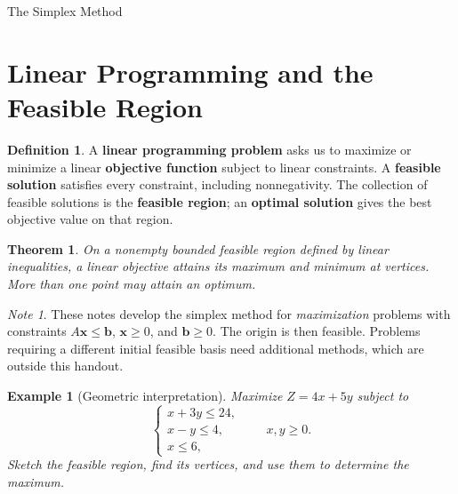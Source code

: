 \documentclass{article}
\theoremstyle{plain}
\newtheorem{theorem}{Theorem}[section]
\newtheorem{example}{Example}[section]
\theoremstyle{definition}
\newtheorem{definition}{Definition}[section]
\theoremstyle{remark}
\newtheorem*{note}{Note}
\renewcommand{\vec}[1]{\mathbf{#1}}
\begin{document}
\begin{center}\huge The Simplex Method\end{center}
\section{Linear Programming and the Feasible Region}
\begin{definition}
A \textbf{linear programming problem} asks us to maximize or minimize a linear \textbf{objective function} subject to linear constraints. A \textbf{feasible solution} satisfies every constraint, including nonnegativity. The collection of feasible solutions is the \textbf{feasible region}; an \textbf{optimal solution} gives the best objective value on that region.
\end{definition}
\begin{theorem}
On a nonempty bounded feasible region defined by linear inequalities, a linear objective attains its maximum and minimum at vertices. More than one point may attain an optimum.
\end{theorem}
\begin{note}
These notes develop the simplex method for \emph{maximization} problems with constraints $A\vec{x}\le\vec{b}$, $\vec{x}\ge0$, and $\vec{b}\ge0$. The origin is then feasible. Problems requiring a different initial feasible basis need additional methods, which are outside this handout.
\end{note}
\begin{example}[Geometric interpretation]\label{ex:geometry}
Maximize $Z=4x+5y$ subject to
\[
\begin{cases}x+3y\le24,\\x-y\le4,\\x\le6,\end{cases}\qquad x,y\ge0.
\]
Sketch the feasible region, find its vertices, and use them to determine the maximum.
\end{example}
\medskip
\end{document}
